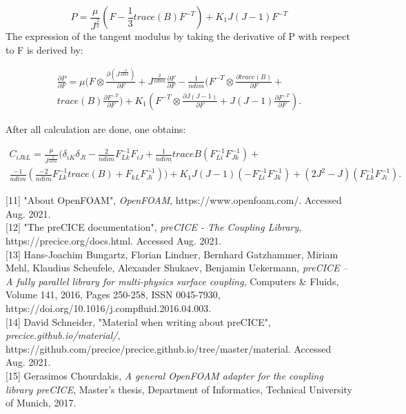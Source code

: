 \documentclass[oneside,11pt,times]{book}
\begin{document}
\begin{equation}
    P = \frac{\mu}{J^{\frac{2}{3}}}(F - \frac{1}{3}trace(B)F^{-T}) +K_{1}J(J-1)F^{-T}
    \end{equation}
The expression of the tangent modulus by taking the derivative of P with respect to F is derived by:

\begin{equation}
\begin{split}
\frac{\partial P}{\partial F} = \mu(F\otimes\frac{\partial(J^{\frac{-2}{ndim}})}{\partial F} + J^{\frac{2}{ndim}}\frac{\partial F}{\partial F} -  \frac{1}{ndim}(F^{-T}\otimes \frac{\partial trace(B)}{\partial F} +\\
trace(B)\frac{\partial F^{-T}}{\partial F}) +
K_{1}(F^{-T}\otimes\frac{\partial J(J-1)}{\partial F}+J(J-1)\frac{\partial F^{-T}}{\partial F}).
\end{split}
\end{equation}

After all calculation are done, one obtains:

\begin{equation}
\begin{split}
C_{iJkL} = \frac{\mu}{J^{\frac{2}{ndim}}}(\delta_{iK}\delta_{Jl}
-\frac{2}{ndim}F_{Lk}^{-1}F_{iJ}+\frac{1}{ndim}traceB(F_{Li}^{-1}F_{Jk}^{-1})+ \\
\frac{-1}{ndim}(\frac{-2}{ndim}F_{Lk}^{-1}trace(B)+F_{kL}F_{Ji}^{-1})) +K_{1}J(J-1)(-F_{Li}^{-1}F_{Jk}^{-1})+(2J^{2}-J)(F_{Lk}^{-1}F_{Ji}^{-1}).
\end{split}
\end{equation}





[11] "About OpenFOAM", \emph{OpenFOAM}, https://www.openfoam.com/. Accessed Aug. 2021.\\

[12] "The preCICE documentation", \emph{preCICE - The Coupling Library},\\ https://precice.org/docs.html. Accessed Aug. 2021.\\

[13] Hans-Joachim Bungartz, Florian Lindner, Bernhard Gatzhammer, Miriam Mehl, Klaudius Scheufele, Alexander Shukaev, Benjamin Uekermann, \emph{preCICE – A fully parallel library for multi-physics surface coupling}, Computers \& Fluids, Volume 141, 2016, Pages 250-258, ISSN 0045-7930, \\https://doi.org/10.1016/j.compfluid.2016.04.003.\\

[14] David Schneider, "Material when writing about preCICE", \emph{precice.github.io/material/},\\ https://github.com/precice/precice.github.io/tree/master/material. Accessed Aug. 2021.\\

[15] Gerasimos Chourdakis,  \emph{A general OpenFOAM adapter for the coupling library preCICE}, Master's thesis, Department of Informatics, Technical University of Munich, 2017.\\
\end{document}
